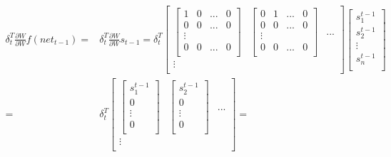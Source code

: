 \begin{align*}
	\delta_t^T\frac{\partial{W}}{\partial{W}}f({{net}_{t-1}})= & \delta_t^T\frac{\partial{W}}{\partial{W}}{{s}_{t-1}}=\delta_t^T
	\begin{bmatrix}
		\begin{bmatrix}
			1 & 0 & ... & 0 \\
			0 & 0 & ... & 0 \\
			\vdots          \\
			0 & 0 & ... & 0 \\
		\end{bmatrix} &
		\begin{bmatrix}
			0 & 1 & ... & 0 \\
			0 & 0 & ... & 0 \\
			\vdots          \\
			0 & 0 & ... & 0 \\
		\end{bmatrix} & ... \\
		\vdots                           \\
	\end{bmatrix}
	\begin{bmatrix}
		s_1^{t-1} \\
		s_2^{t-1} \\
		\vdots    \\
		s_n^{t-1} \\
	\end{bmatrix}                                                                                                   \\
	=                                                          & \delta_t^T
	\begin{bmatrix}
		\begin{bmatrix}
			s_1^{t-1} \\
			0         \\
			\vdots    \\
			0         \\
		\end{bmatrix} &
		\begin{bmatrix}
			s_2^{t-1} \\
			0         \\
			\vdots    \\
			0         \\
		\end{bmatrix} & ... \\
		\vdots                           \\
	\end{bmatrix}=

\end{align*}
